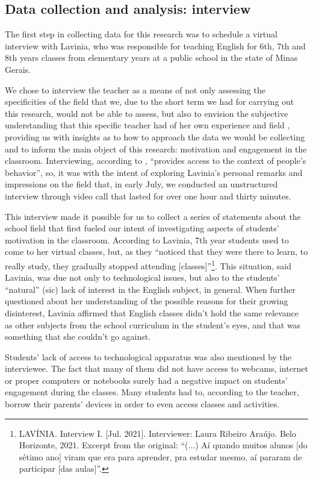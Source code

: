 \documentclass[english]{textolivre}
\begin{document}
\subsection{Data collection and analysis: interview}

The first step in collecting data for this research was to schedule a virtual interview with Lavinia, who was responsible for teaching English for 6th, 7th and 8th years classes from elementary years at a public school in the state of Minas Gerais.

We chose to interview the teacher as a means of not only assessing the specificities of the field that we, due to the short term we had for carrying out this research, would not be able to assess, but also to envision the subjective understanding that this specific teacher had of her own experience and field \cite{seidman2006interviewing}, providing us with insights as to how to approach the data we would be collecting and to inform the main object of this research: motivation and engagement in the classroom. Interviewing, according to \textcite[p. 10]{seidman2006interviewing}, “provides access to the context of people’s behavior”, so, it was with the intent of exploring Lavinia’s personal remarks and impressions on the field that, in early July, we conducted an unstructured interview through video call that lasted for over one hour and thirty minutes.

This interview made it possible for us to collect a series of statements about the school field that first fueled our intent of investigating aspects of students’ motivation in the classroom. According to Lavinia, 7th year students used to come to her virtual classes, but, as they “noticed that they were there to learn, to really study, they gradually stopped attending [classes]”\footnote{LAVÍNIA. Interview I. [Jul. 2021]. Interviewer: Laura Ribeiro Araújo. Belo Horizonte, 2021. Excerpt from the original: “(...) Aí quando muitos alunos [do sétimo ano] viram que era para aprender, pra estudar mesmo, aí pararam de participar [das aulas]”.}. This situation, said Lavinia, was due not only to technological issues, but also to the students’ “natural” (sic) lack of interest in the English subject, in general. When further questioned about her understanding of the possible reasons for their growing disinterest, Lavinia affirmed that English classes didn’t hold the same relevance as other subjects from the school curriculum in the student’s eyes, and that was something that she couldn’t go against.

Students’ lack of access to technological apparatus was also mentioned by the interviewee. The fact that many of them did not have access to webcams, internet or proper computers or notebooks surely had a negative impact on students’ engagement during the classes. Many students had to, according to the teacher, borrow their parents’ devices in order to even access classes and activities.
\end{document}
